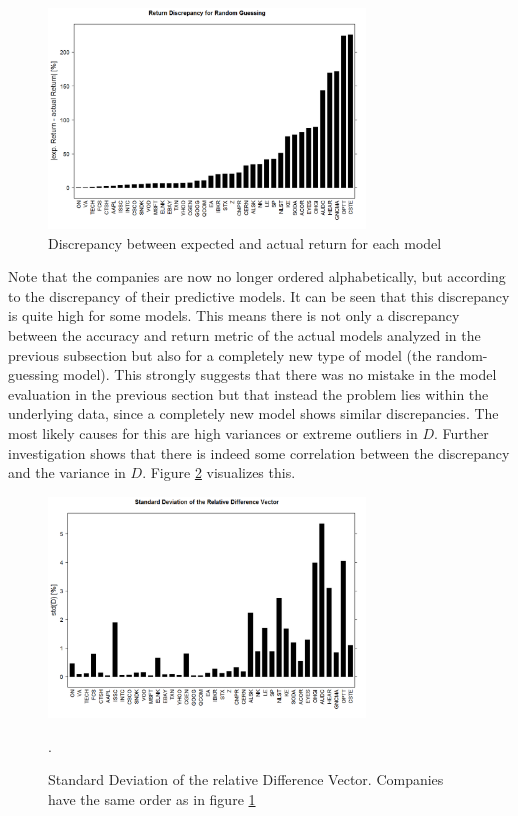 \begin{figure}[h]
	\centering
  	\includegraphics[width=0.75\textwidth]{returnDiscrepancy}
	\caption{Discrepancy between expected and actual return for each model}
	\label{fig_returnDiscrepancy}
\end{figure}

Note that the companies are now no longer ordered alphabetically, but according to the discrepancy of their predictive models. It can be seen that this discrepancy is quite high for some models. This means there is not only a discrepancy between the accuracy and return metric of the actual models analyzed in the previous subsection but also for a completely new type of model (the random-guessing model). This strongly suggests that there was no mistake in the model evaluation in the previous section but that instead the problem lies within the underlying data, since a completely new model shows similar discrepancies. The most likely causes for this are high variances or extreme outliers in $D$. Further investigation shows that there is indeed some correlation between the discrepancy and the variance in $D$. Figure \ref{fig_stdDiscrepancy} visualizes this.

\begin{figure}[h]
	\centering
  	\includegraphics[width=0.75\textwidth]{stdDiscrepancy}
	\caption{Standard Deviation of the relative Difference Vector. Companies have the same order as in figure \ref{fig_returnDiscrepancy}}.
	\label{fig_stdDiscrepancy}
\end{figure}


